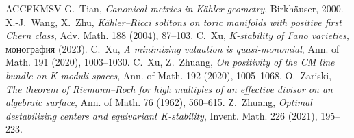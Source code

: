 \documentclass[11pt,a4paper]{article}
\theoremstyle{plain}
\theoremstyle{definition}
\theoremstyle{remark}
\begin{document}
\begin{thebibliography}{ACCFKMSV}
 G.~Tian, \emph{Canonical metrics in K\"ahler geometry}, Birkh\"auser, 2000.
 X.-J.~Wang, X.~Zhu, \emph{K\"ahler--Ricci solitons on toric manifolds with positive first Chern class}, Adv. Math. 188 (2004), 87--103.
 C.~Xu, \emph{K-stability of Fano varieties}, монография (2023).
 C.~Xu, \emph{A minimizing valuation is quasi-monomial}, Ann. of Math. 191 (2020), 1003--1030.
 C.~Xu, Z.~Zhuang, \emph{On positivity of the CM line bundle on K-moduli spaces}, Ann. of Math. 192 (2020), 1005--1068.
 O.~Zariski, \emph{The theorem of Riemann--Roch for high multiples of an effective divisor on an algebraic surface}, Ann. of Math. 76 (1962), 560--615.
 Z.~Zhuang, \emph{Optimal destabilizing centers and equivariant K-stability}, Invent. Math. 226 (2021), 195--223.
\end{thebibliography}
\end{document}

